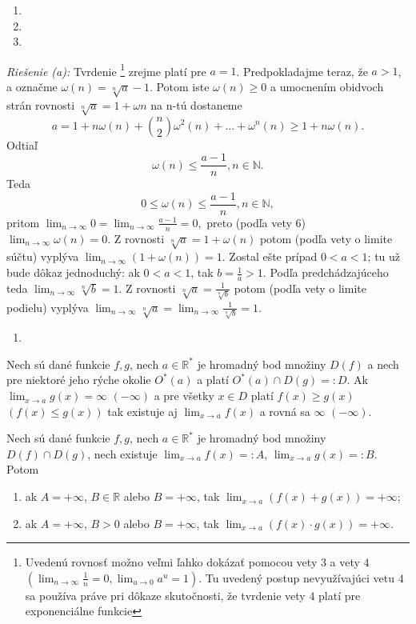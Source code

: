 \begin{enumerate}[resume]
  \item {}
  \item {}
  \item {}
\end{enumerate}

\textit{Riešenie (a):}
Tvrdenie \footnote{Uvedenú rovnosť možno veľmi ľahko dokázať pomocou vety $3$ a vety $4$ $(\lim_{n \rightarrow \infty} \frac{1}{n}=0, \lim_{u \rightarrow 0} a^u=1)$. Tu uvedený postup nevyužívajúci vetu $4$ sa používa práve pri dôkaze skutočnosti, že tvrdenie vety $4$ platí pre exponenciálne funkcie} zrejme platí pre $a=1$. Predpokladajme teraz, že $a>1$, a označme $\omega (n)=\sqrt[n]{a}-1$. Potom iste $\omega (n)\geq 0$ a umocnením obidvoch strán rovnosti $\sqrt[n]{a}=1+\omega n$ na n-tú dostaneme
$$a=1+n \omega(n)+{n \choose 2}\omega^2 (n)+...+\omega^n (n)\geq 1+n\omega (n).$$
Odtiaľ $$\omega (n) \leq \frac{a-1}{n}, n\in \mathbb{N}.$$
Teda $$0\leq \omega (n) \leq \frac{a-1}{n}, n \in \mathbb{N},$$
pritom $\lim_{n \rightarrow \infty} 0=\lim_{n \rightarrow \infty} \frac{a-1}{n}=0,$ preto (podľa vety $6$) $\lim_{n \rightarrow \infty}\omega (n)=0.$ Z rovnosti $\sqrt[n]{a}=1+\omega (n)$ potom (podľa vety o limite súčtu) vyplýva $\lim_{n \rightarrow \infty} (1+\omega (n))=1$. Zostal ešte prípad $0<a<1$; tu už bude dôkaz jednoduchý: ak $0<a<1$, tak $b=\frac{1}{a}>1$. Podľa predchádzajúceho teda $\lim_{n \rightarrow \infty} \sqrt[n]{b}=1$. Z rovnosti $\sqrt[n]{a}=\frac{1}{\sqrt[n]{b}}$ potom (podľa vety o limite podielu) vyplýva $\lim_{n \rightarrow \infty} \sqrt[n]{a}=\lim_{n \rightarrow \infty} \frac{1}{\sqrt[n]{b}}=1$.

\begin{enumerate}[resume]
  \item {}
\end{enumerate}

\begin{veta}
Nech sú dané funkcie $f,g$, nech $a \in \mathbb{R^*}$ je hromadný bod množiny $D(f)$ a nech pre niektoré jeho rýche okolie $O^*(a)$ a platí $O^*(a)\cap D(g)=:D$. Ak $\lim_{x \rightarrow a} g(x)=\infty$  $(-\infty)$ a pre všetky $x \in D$ platí $f(x)\geq g(x)$  $(f(x)\leq g(x))$ tak existuje aj $\lim_{x \rightarrow a} f(x)$ a rovná sa $\infty$  $(-\infty)$.
\end{veta}

\begin{veta}
Nech sú dané funkcie $f,g$, nech $a \in \mathbb{R^*}$ je hromadný bod množiny $D(f)\cap D(g)$, nech existuje $\lim_{x \rightarrow a} f(x)=:A$,  $\lim_{x \rightarrow a} g(x)=:B$. Potom
\begin{enumerate}
\item ak $A=+\infty$, $B \in \mathbb{R}$ alebo $B=+\infty$, tak $\lim_{x \rightarrow a}(f(x)+g(x))=+\infty$;
\item ak $A=+\infty$, $B >0$ alebo $B=+\infty$, tak $\lim_{x \rightarrow a}(f(x)\cdot g(x))=+\infty$.
\end{enumerate}
\end{veta}

